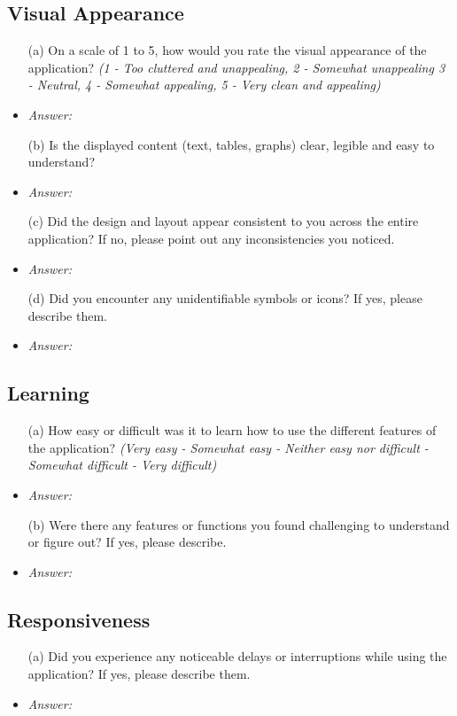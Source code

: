 \documentclass{article}
\begin{document}
\subsection*{\textbf{Visual Appearance}}
  \begin{itemize}
    \item[(a)] On a scale of 1 to 5, how would you rate the visual appearance of
    the application? \textit{(1 - Too cluttered and unappealing, 2 - Somewhat
    unappealing 3 - Neutral, 4 - Somewhat appealing, 5 - Very clean and
    appealing)}
    \item \emph{Answer:}
    \item[(b)] Is the displayed content (text, tables, graphs) clear, legible
    and easy to understand?
    \item \emph{Answer:}
    \item[(c)] Did the design and layout appear consistent to you across
    the entire application? If no, please point out any inconsistencies you noticed.
    \item \emph{Answer:}
    \item[(d)] Did you encounter any unidentifiable symbols or icons? If yes,
    please describe them.
    \item \emph{Answer:}
  \end{itemize}

\subsection*{\textbf{Learning}}
  \begin{itemize}
    \item[(a)] How easy or difficult was it to learn how to use the different
    features of the application? \textit{(Very easy - Somewhat easy - Neither
    easy nor difficult - Somewhat difficult - Very difficult)}
    \item \emph{Answer:}
    \item[(b)] Were there any features or functions you found challenging to
    understand or figure out? If yes, please describe. 
    \item \emph{Answer:}
  \end{itemize}

\subsection*{\textbf{Responsiveness}}
  \begin{itemize}
    \item[(a)] Did you experience any noticeable delays or interruptions while
    using the application? If yes, please describe them.
    \item \emph{Answer:}
  \end{itemize}
\end{document}
